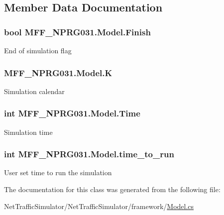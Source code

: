 \subsection{Member Data Documentation}
\hypertarget{classMFF__NPRG031_1_1Model_ab1ba01c979484275f2e4707ea8cdbaa3}{
\subsubsection[{Finish}]{\setlength{\rightskip}{0pt plus 5cm}bool M\-F\-F\-\_\-\-N\-P\-R\-G031.\-Model.\-Finish}}\label{classMFF__NPRG031_1_1Model_ab1ba01c979484275f2e4707ea8cdbaa3}
End of simulation flag \hypertarget{classMFF__NPRG031_1_1Model_a233a1b86d155560a2c51526a5eac7222}{
\subsubsection[{K}]{ M\-F\-F\-\_\-\-N\-P\-R\-G031.\-Model.\-K}}\label{classMFF__NPRG031_1_1Model_a233a1b86d155560a2c51526a5eac7222}
Simulation calendar \hypertarget{classMFF__NPRG031_1_1Model_a1e8fd74f1d69f6c7c71d5d1e08388e8e}{
\subsubsection[{Time}]{\setlength{\rightskip}{0pt plus 5cm}int M\-F\-F\-\_\-\-N\-P\-R\-G031.\-Model.\-Time}}\label{classMFF__NPRG031_1_1Model_a1e8fd74f1d69f6c7c71d5d1e08388e8e}
Simulation time \hypertarget{classMFF__NPRG031_1_1Model_a1e2a81337bc96f78f6336be46cdf0263}{
\subsubsection[{time\-\_\-to\-\_\-run}]{\setlength{\rightskip}{0pt plus 5cm}int M\-F\-F\-\_\-\-N\-P\-R\-G031.\-Model.\-time\-\_\-to\-\_\-run\hspace{0.3cm}{\ttfamily [private]}}}\label{classMFF__NPRG031_1_1Model_a1e2a81337bc96f78f6336be46cdf0263}
User set time to run the simulation 

The documentation for this class was generated from the following file\-:\begin{DoxyCompactItemize}
\item 
Net\-Traffic\-Simulator/\-Net\-Traffic\-Simulator/framework/\hyperlink{Model_8cs}{Model.\-cs}\end{DoxyCompactItemize}
